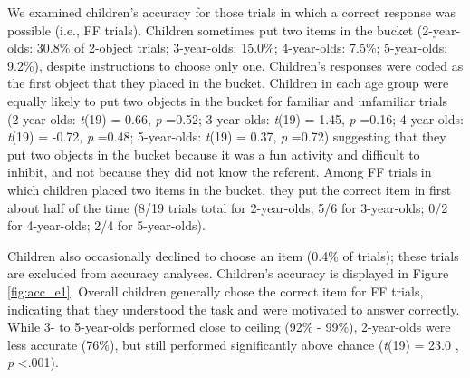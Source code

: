 \documentclass[a4paper,man,apacite,floatsintext]{apa6}
\begin{document}
We examined children's accuracy for those trials in which a correct
response was possible (i.e., FF trials). Children sometimes put two
items in the bucket (2-year-olds: 30.8\% of 2-object trials;
3-year-olds: 15.0\%; 4-year-olds: 7.5\%; 5-year-olds: 9.2\%), despite
instructions to choose only one. Children's responses were coded as the
first object that they placed in the bucket. Children in each age group
were equally likely to put two objects in the bucket for familiar and
unfamiliar trials (2-year-olds: \emph{t}(19) = 0.66, \emph{p} =0.52;
3-year-olds: \emph{t}(19) = 1.45, \emph{p} =0.16; 4-year-olds:
\emph{t}(19) = -0.72, \emph{p} =0.48; 5-year-olds: \emph{t}(19) = 0.37,
\emph{p} =0.72) suggesting that they put two objects in the bucket
because it was a fun activity and difficult to inhibit, and not because
they did not know the referent. Among FF trials in which children placed
two items in the bucket, they put the correct item in first about half
of the time (8/19 trials total for 2-year-olds; 5/6 for 3-year-olds; 0/2
for 4-year-olds; 2/4 for 5-year-olds).

Children also occasionally declined to choose an item (0.4\% of trials);
these trials are excluded from accuracy analyses. Children's accuracy is
displayed in Figure \ref{fig:acc_e1}. Overall children generally chose
the correct item for FF trials, indicating that they understood the task
and were motivated to answer correctly. While 3- to 5-year-olds
performed close to ceiling (92\% - 99\%), 2-year-olds were less accurate
(76\%), but still performed significantly above chance (\emph{t}(19) =
23.0 , \emph{p} \textless{}.001).
\end{document}

